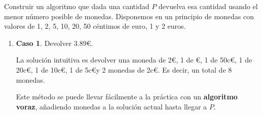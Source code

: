 \documentclass[10pt,a4paper,spanish]{report}
\theoremstyle{definition}
\theoremstyle{remark}
\begin{document}
Construir un algoritmo que dada una cantidad $P$ devuelva esa cantidad usando el menor número posible de monedas. Disponemos en un principio de monedas con valores de 1, 2, 5, 10, 20, 50 céntimos de euro, 1 y 2 euros.
\begin{enumerate}[$\bullet$]
    \item \textbf{\textcolor{electriccrimson}{Caso 1}}. Devolver 3.89\euro.

    La solución intuitiva es devolver una moneda de 2\euro, 1 de \euro, 1 de 50c\euro, 1 de 20c\euro, 1 de 10c\euro, 1 de 5c\euro y 2 monedas de 2c\euro. Es decir, un total de 8 monedas.

    Este método se puede llevar fácilmente a la práctica con un \textbf{\textcolor{electriccrimson}{algoritmo voraz}}, añadiendo monedas a la solución actual hasta llegar a $P$.


\end{enumerate}
\end{document}
